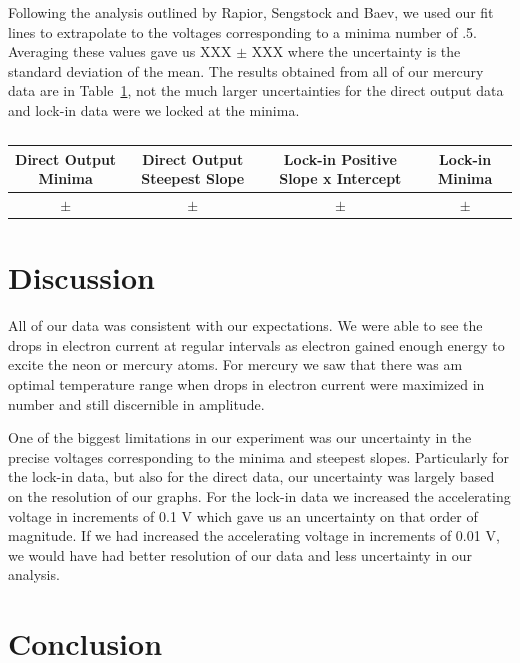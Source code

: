 \documentclass[prb,preprint]{revtex4-1}
\begin{document}
Following the analysis outlined by Rapior, Sengstock and Baev, we used our fit lines to extrapolate to the voltages corresponding to a minima number of .5. Averaging these values gave us XXX $\pm$ XXX where the uncertainty is the standard deviation of the mean. The results obtained from all of our mercury data are in Table~\ref{hg_results}, not the much larger uncertainties for the direct output data and lock-in data were we locked at the minima.  


\begin{table}[h!]
\centering
\caption{ }
\begin{ruledtabular}
\begin{tabular}{c c c c}
Direct Output Minima & Direct Output Steepest Slope & Lock-in Positive Slope x Intercept & Lock-in Minima  \\
\hline	%

 $\pm$ & $\pm$ & $\pm$ & $\pm$  \\

\end{tabular}
\end{ruledtabular}
\label{hg_results}
\end{table}



\section{Discussion}

All of our data was consistent with our expectations. We were able to see the drops in electron current at regular intervals as electron gained enough energy to excite the neon or mercury atoms. For mercury we saw that there was am optimal temperature range when drops in electron current were maximized in number and still discernible in amplitude. 

One of the biggest limitations in our experiment was our uncertainty in the precise voltages corresponding to the minima and steepest slopes. Particularly for the lock-in data, but also for the direct data, our uncertainty was largely based on the resolution of our graphs. For the lock-in data we increased the accelerating voltage in increments of 0.1 V which gave us an uncertainty on that order of magnitude. If we had increased the accelerating voltage in increments of 0.01 V, we would have had better resolution of our data and less uncertainty in our analysis. 

\section{Conclusion}
\end{document}
